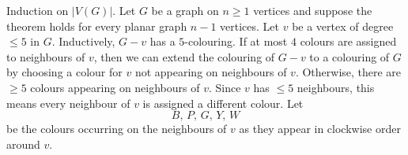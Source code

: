 \begin{Proof}{}{}
    Induction on $ |V(G)| $. Let $ G $ be a graph on $ n\geqslant 1 $
    vertices and suppose the theorem holds for every planar graph
    $ n-1 $ vertices. Let $ v $ be a vertex of degree $ \leqslant 5 $
    in $ G $. Inductively, $ G-v $ has a $ 5 $-colouring.
    If at most $ 4 $ colours are assigned to neighbours of $ v $,
    then we can extend the colouring of $ G-v $ to a colouring of
    $ G $ by choosing a colour for $ v $ not appearing on
    neighbours of $ v $. Otherwise, there are $ \geqslant 5 $ colours
    appearing on neighbours of $ v $. Since $ v $ has $ \leqslant 5 $
    neighbours, this means every neighbour of $ v $ is assigned
    a different colour.
    Let
    \[ B,\,P,\,G,\,Y,\,W \]
    be the colours occurring on the neighbours of $ v $ as they appear in
    clockwise order around $ v $.

    \begin{figure}[H]
        \centering
        \begin{tikzpicture}[x=0.75pt,y=0.75pt,yscale=-1,xscale=1]


\end{tikzpicture}
\end{figure}
\end{Proof}
